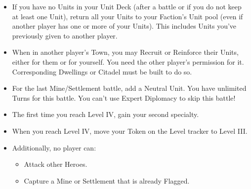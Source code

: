 \begin{multicols*}{2}
\begin{itemize}
  \item If you have no Units in your Unit Deck (after a battle or if you do not keep at least one Unit), return all your Units to your Faction's Unit pool (even if another player has one or more of your Units). This includes Units you've previously given to another player.

  \item When in another player's Town, you may Recruit or Reinforce their Units, either for them or for yourself. You need the other player's permission for it. Corresponding Dwellings or Citadel must be built to do so.

  \item For the last Mine/Settlement battle, add a  Neutral Unit. You have unlimited Turns for this battle. You can't use Expert Diplomacy to skip this battle!
  \vspace*{\fill}\columnbreak

  \item The first time you reach Level IV, gain your second specialty.

  \item When you reach Level IV, move your Token on the Level tracker to Level III.

  \item Additionally, no player can:
  \begin{itemize}
    \item Attack other Heroes.
    \item Capture a Mine or Settlement that is already Flagged.
  \end{itemize}
\end{itemize}

\vspace*{\fill}

\end{multicols*}
